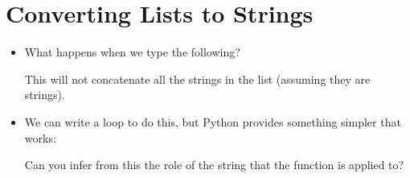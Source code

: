 \documentclass[letterpaper,10pt,english]{sphinxmanual}
\begin{document}
\section{Converting Lists to Strings}
\label{\detokenize{lecture_notes/lec10_lists2:converting-lists-to-strings}}\begin{itemize}
\item {} 
What happens when we type the following?

\begin{sphinxVerbatim}[commandchars=\\\{\}]
  
  
  
\end{sphinxVerbatim}

This will not concatenate all the strings in the list (assuming they are
strings).

\item {} 
We can write a  loop to do this, but Python provides
something simpler that works:

\begin{sphinxVerbatim}[commandchars=\\\{\}]
  \PYG{p}{[}     \PYG{p}{]}
\end{sphinxVerbatim}

Can you infer from this the role of the string that the  function
is applied to?

\end{itemize}
\end{document}
